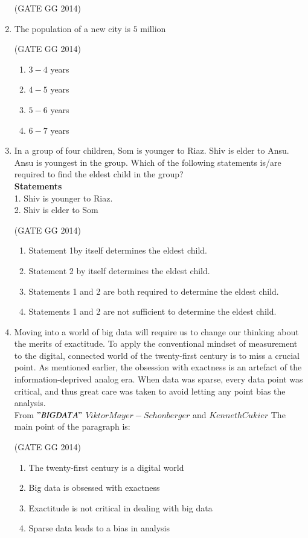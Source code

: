 \documentclass[journal]{IEEEtran}
\begin{document}
\begin{enumerate}[start=1]
\hfill{(GATE GG 2014)}

\item The population of a new city is $5$ million 

\hfill{(GATE GG 2014)}
\begin{multicols}{4}
\begin{enumerate}
    \item  $3-4$ years
\item $4-5$ years
\item  $5-6$ years
\item  $6-7$ years
\end{enumerate}    
\end{multicols}


\item In a group of four children, Som is younger to Riaz. Shiv is elder to Ansu. Ansu is youngest in the group. Which of the following statements is/are required to find the eldest child in the group?\\
\textbf{Statements}\\
    1. Shiv is younger to Riaz.\\
    2. Shiv is elder to Som

    \hfill{(GATE GG 2014)}
\begin{enumerate}
    \item  Statement 1by itself determines the eldest child.
\item  Statement 2 by itself determines the eldest child.
\item  Statements 1 and 2 are both required to determine the eldest child.
\item  Statements 1 and 2 are not sufficient to determine the eldest child.
\end{enumerate}

\item Moving into a world of big data will require us to change our thinking about the merits of exactitude. To apply the conventional mindset of measurement to the digital, connected world of the twenty-first century is to miss a crucial point. As mentioned earlier, the obsession with exactness is an artefact of the information-deprived analog era. When data was sparse, every data point was critical, and thus great care was taken to avoid letting any point bias the analysis.\\
From $"BIG DATA"$ $Viktor Mayer-Schonberger$ and $Kenneth Cukier$
The main point of the paragraph is:

\hfill{(GATE GG 2014)}
\begin{enumerate}
    \item  The twenty-first century is a digital world
\item  Big data is obsessed with exactness
\item Exactitude is not critical in dealing with big data
\item Sparse data leads to a bias in analysis
\end{enumerate}


\end{enumerate}
\end{document}
